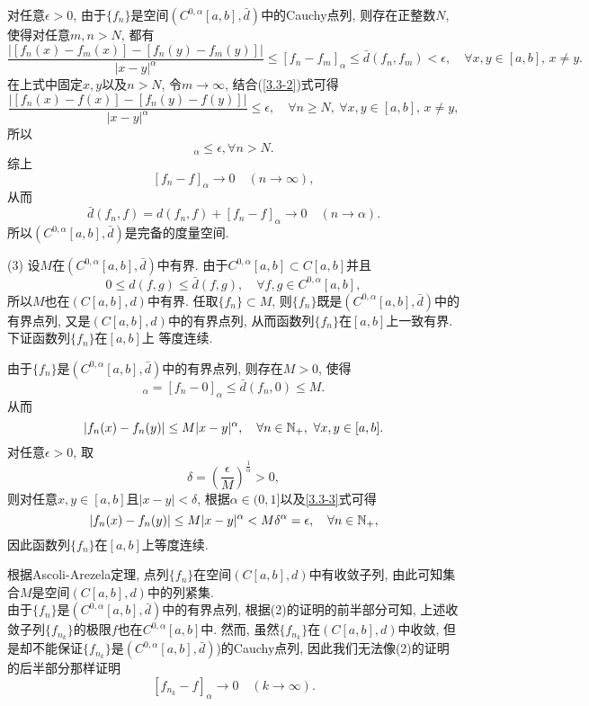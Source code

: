 \documentclass[UTF8,oneside,12pt]{article}  %
\makeatletter
\theoremstyle{DingLi1}
\numberwithin{equation}{section}
\theoremstyle{DingLi2}
\renewenvironment{proof}[1][\proofname]{\par%
\pushQED{\qed}%
\normalfont \topsep6\p@\@plus6\p@\relax%
\trivlist%
\item[\hskip\labelsep%
#1]\ignorespaces%
}{%
\popQED\endtrivlist\@endpefalse%
}
\renewcommand{\proofname}{\heiti\large\color{blue} 证明}%
\makeatother
\begin{document}
\begin{proof}
对任意$\epsilon>0$, 由于$\{f_n\}$是空间$(C^{0,\alpha}[a,b],\bar{d})$中的Cauchy点列, 则存在正整数$N$, 使得对任意$m,n>N$, 都有
\begin{equation*}
\frac{\big|[f_n(x)-f_m(x)]-[f_n(y)-f_m(y)]\big|}{|x-y|^\alpha}\leq [f_n-f_m]_\alpha \leq \bar{d}(f_n,f_m)<\epsilon,\quad \forall x,y\in [a,b],\,x\neq y.
\end{equation*}
在上式中固定$x,y$以及$n>N$, 令$m\to\infty$, 结合(\ref{3.3-2})式可得
\begin{equation*}
\frac{\big|[f_n(x)-f(x)]-[f_n(y)-f(y)]\big|}{|x-y|^\alpha}\leq \epsilon,\quad \forall n\geq N,\ \forall x,y\in [a,b],\,x\neq y,
\end{equation*}
所以
\begin{equation*}
  [f_n-f]_\alpha\leq \epsilon, \forall n>N.
\end{equation*}
综上
$$[f_n-f]_\alpha\to 0\quad (n\to \infty),$$
从而
$$\bar{d}(f_n,f)=d(f_n,f)+[f_n-f]_\alpha\to 0\quad(n\to \alpha).$$
所以$(C^{0,\alpha}[a,b],\bar{d})$是完备的度量空间.



(3) 设$M$在$(C^{0,\alpha}[a,b],\bar{d})$中有界. 由于$C^{0,\alpha}[a,b]\subset C[a,b]$并且
$$0\leq d(f,g)\leq  \bar{d}(f,g), \quad\forall f,g\in C^{0,\alpha}[a,b],$$
所以$M$也在$(C[a,b],d)$中有界. 任取$\{f_n\}\subset M$, 则$\{f_n\}$既是$(C^{0,\alpha}[a,b],\bar{d})$中的有界点列, 又是$(C[a,b],d)$中的有界点列, 从而函数列$\{f_n\}$在$[a,b]$上一致有界. 下证函数列$\{f_n\}$在$[a,b]$上
等度连续.

由于$\{f_n\}$是$(C^{0,\alpha}[a,b],\bar{d})$中的有界点列, 则存在$M>0$, 使得
\begin{equation*}
[f_n]_\alpha =[f_n-0]_\alpha \leq \bar{d}(f_n,0)\leq M.
\end{equation*}
从而
\begin{equation}\label{3.3-3}
|f_n(x)-f_n(y)|\leq M |x-y|^\alpha,\quad \forall n\in \Bbb{N}_+,\ \forall x,y\in [a,b].
\end{equation}
对任意$\epsilon>0$, 取
$$\delta=\left(\frac{\epsilon}{M}\right)^{\frac{1}{\alpha}}>0,$$
则对任意$x,y\in [a,b]$且$|x-y|<\delta$, 根据$\alpha\in (0,1]$以及\eqref{3.3-3}式可得
$$|f_n(x)-f_n(y)|\leq M |x-y|^\alpha<M\delta^\alpha=\epsilon,\quad \forall n\in \Bbb{N}_+,$$
因此函数列$\{f_n\}$在$[a,b]$上等度连续.

根据Ascoli-Arezela定理, 点列$\{f_n\}$在空间$(C[a,b],d)$中有收敛子列, 由此可知集合$M$是空间$(C[a,b],d)$中的列紧集.\\
\textcolor[rgb]{1.00,0.00,0.00}{由于$\{f_n\}$是$(C^{0,\alpha}[a,b],\bar{d})$中的有界点列, 根据(2)的证明的前半部分可知, 上述收敛子列$\{f_{n_k}\}$的极限$f$也在$C^{0,\alpha}[a,b]$中. 然而, 虽然$\{f_{n_k}\}$在$(C[a,b],d)$中收敛, 但是却不能保证$\{f_{n_k}\}$是$(C^{0,\alpha}[a,b],\bar{d})$)的Cauchy点列, 因此我们无法像(2)的证明的后半部分那样证明
$$\left[f_{n_k}-f\right]_\alpha \to 0\quad (k\to \infty).$$}
\end{proof}
\end{document}
